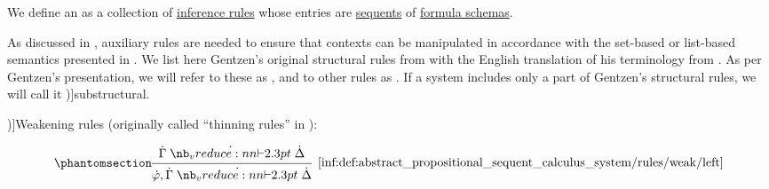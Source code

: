 \begin{definition}\label{def:abstract_propositional_sequent_calculus_system}\mimprovised
  We define an  as a collection of \hyperref[def:inference_rule]{inference rules} whose entries are \hyperref[def:sequent]{sequents} of \hyperref[def:propositional_formula_schema]{formula schemas}.

  As discussed in , auxiliary rules are needed to ensure that contexts can be manipulated in accordance with the set-based or list-based semantics presented in . We list here Gentzen's original structural rules from \cite[192]{Gentzen1935LogischeSchließen} with the English translation of his terminology from \cite[296]{Gentzen1964LogicalDeduction}. As per Gentzen's presentation, we will refer to these as , and to other rules as . If a system includes only a part of Gentzen's structural rules, we will call it \term[en=substructural (\cite[91]{TroelstraSchwichtenberg2000BasicProofTheory})]{substructural}.

  \begin{thmenum}
     \term[ru=правила добавления (\cite[217]{КолмогоровДрагалин2006Логика})]{Weakening rules} (originally called \enquote{thinning rules} in \cite[296]{Gentzen1964LogicalDeduction}):
    \begin{paracol}{2}
      \begin{leftcolumn}
        \ParacolAlignmentHack
        \begin{equation*}\taglabel[\ensuremath{ \logic{Weak}_L }]{inf:def:abstract_propositional_sequent_calculus_system/rules/weak/left}
          \begin{prooftree}
            \hypo{ \syn\Gamma \synvdash \syn\Delta }
            \infer1[\ref{inf:def:abstract_propositional_sequent_calculus_system/rules/weak/left}]{ \syn\varphi, \syn\Gamma \synvdash \syn\Delta }
          \end{prooftree}
        \end{equation*}
      \end{leftcolumn}


\end{paracol}
\end{thmenum}
\end{definition}

